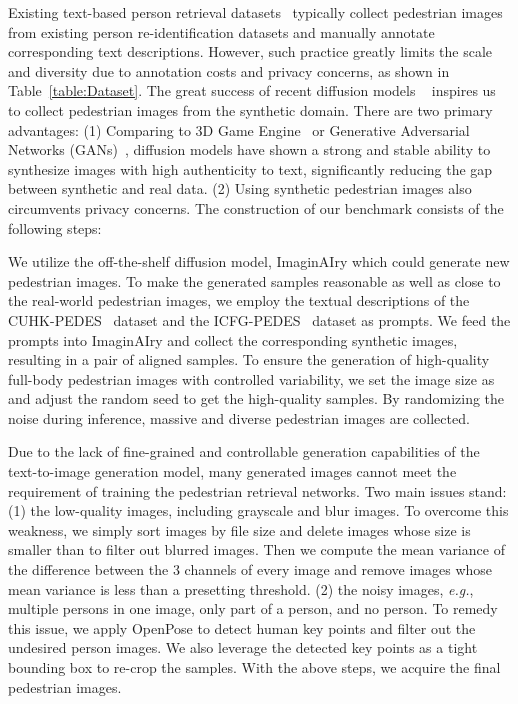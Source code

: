 \documentclass[sigconf]{acmart}
\def\eg{\emph{e.g.}}
\begin{document}
Existing text-based person retrieval datasets~\cite{li2017person, ding2021semantically, zhu2021dssl} typically collect pedestrian images from existing person re-identification datasets and manually annotate corresponding text descriptions. However, such practice greatly limits the scale and diversity due to annotation costs and privacy concerns, as shown in Table~\ref{table:Dataset}.
The great success of recent diffusion models ~\cite{rombach2022high,brooks2022instructpix2pix, hertz2022prompt} inspires us to collect pedestrian images from the synthetic domain. 
There are two primary advantages: 
(1) Comparing to 3D Game Engine~\cite{sun2019dissecting,xiang2021less,wang2020surpassing} or Generative Adversarial Networks (GANs)~\cite{zheng2017unlabeled,tang2019cycle,zheng2019joint,jiang2021exploring}, diffusion models have shown a strong and stable ability to synthesize images with high authenticity to text, significantly reducing the gap between synthetic and real data. (2) Using synthetic pedestrian images also circumvents privacy concerns. The construction of our benchmark consists of the following steps:


We utilize the off-the-shelf diffusion model, ImaginAIry \cite{imaginAIry} which could generate new pedestrian images. 
To make the generated samples reasonable as well as close to the real-world pedestrian images, we employ the textual descriptions of the CUHK-PEDES~\cite{li2017person} dataset and the ICFG-PEDES~\cite{ding2021semantically} dataset as prompts. 
We feed the prompts into ImaginAIry and collect the corresponding synthetic images, resulting in a pair of aligned samples. To ensure the generation of high-quality full-body pedestrian images with controlled variability, we set the image size as  and adjust the random seed to get the high-quality samples. By randomizing the noise during inference, massive and diverse pedestrian images are collected. 


\label{sec: postprocessing}
Due to the lack of fine-grained and controllable generation capabilities of the text-to-image generation model, many generated images cannot meet the requirement of training the pedestrian retrieval networks. Two main issues stand: (1) the low-quality images, including grayscale and blur images. 
To overcome this weakness, we simply sort images by file size and delete images whose size is smaller than  to filter out blurred images. Then we compute the mean variance of the difference between the 3 channels of every image and remove images whose mean variance is less than a presetting threshold.
(2) the noisy images, \eg, multiple persons in one image, only part of a person, and no person. To remedy this issue, we apply OpenPose \cite{8765346, simon2017hand, cao2017realtime, wei2016cpm} to detect human key points and filter out the undesired person images. We also leverage the detected key points as a tight bounding box to re-crop the samples. With the above steps, we acquire the final pedestrian images.
\end{document}

